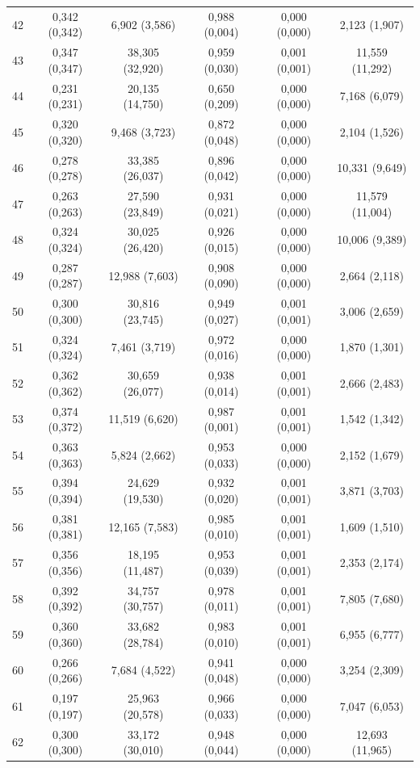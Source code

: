 \begin{tabular}{l c c c c c}
42 & 0,342 (0,342) & 6,902 (3,586) & 0,988 (0,004) & 0,000 (0,000) & 2,123 (1,907) \\
43 & 0,347 (0,347) & 38,305 (32,920) & 0,959 (0,030) & 0,001 (0,001) & 11,559 (11,292) \\
44 & 0,231 (0,231) & 20,135 (14,750) & 0,650 (0,209) & 0,000 (0,000) & 7,168 (6,079) \\
45 & 0,320 (0,320) & 9,468 (3,723) & 0,872 (0,048) & 0,000 (0,000) & 2,104 (1,526) \\
46 & 0,278 (0,278) & 33,385 (26,037) & 0,896 (0,042) & 0,000 (0,000) & 10,331 (9,649) \\
47 & 0,263 (0,263) & 27,590 (23,849) & 0,931 (0,021) & 0,000 (0,000) & 11,579 (11,004) \\
48 & 0,324 (0,324) & 30,025 (26,420) & 0,926 (0,015) & 0,000 (0,000) & 10,006 (9,389) \\
49 & 0,287 (0,287) & 12,988 (7,603) & 0,908 (0,090) & 0,000 (0,000) & 2,664 (2,118) \\
50 & 0,300 (0,300) & 30,816 (23,745) & 0,949 (0,027) & 0,001 (0,001) & 3,006 (2,659) \\
51 & 0,324 (0,324) & 7,461 (3,719) & 0,972 (0,016) & 0,000 (0,000) & 1,870 (1,301) \\
52 & 0,362 (0,362) & 30,659 (26,077) & 0,938 (0,014) & 0,001 (0,001) & 2,666 (2,483) \\
53 & 0,374 (0,372) & 11,519 (6,620) & 0,987 (0,001) & 0,001 (0,001) & 1,542 (1,342) \\
54 & 0,363 (0,363) & 5,824 (2,662) & 0,953 (0,033) & 0,000 (0,000) & 2,152 (1,679) \\
55 & 0,394 (0,394) & 24,629 (19,530) & 0,932 (0,020) & 0,001 (0,001) & 3,871 (3,703) \\
56 & 0,381 (0,381) & 12,165 (7,583) & 0,985 (0,010) & 0,001 (0,001) & 1,609 (1,510) \\
57 & 0,356 (0,356) & 18,195 (11,487) & 0,953 (0,039) & 0,001 (0,001) & 2,353 (2,174) \\
58 & 0,392 (0,392) & 34,757 (30,757) & 0,978 (0,011) & 0,001 (0,001) & 7,805 (7,680) \\
59 & 0,360 (0,360) & 33,682 (28,784) & 0,983 (0,010) & 0,001 (0,001) & 6,955 (6,777) \\
60 & 0,266 (0,266) & 7,684 (4,522) & 0,941 (0,048) & 0,000 (0,000) & 3,254 (2,309) \\
61 & 0,197 (0,197) & 25,963 (20,578) & 0,966 (0,033) & 0,000 (0,000) & 7,047 (6,053) \\
62 & 0,300 (0,300) & 33,172 (30,010) & 0,948 (0,044) & 0,000 (0,000) & 12,693 (11,965) \\

\end{tabular}
